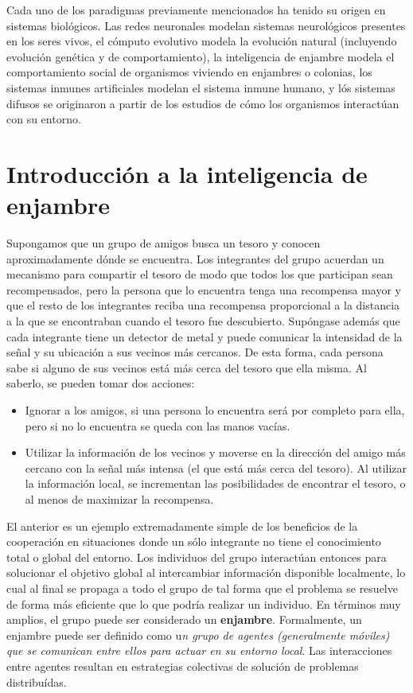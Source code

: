 \documentclass{article}
\begin{document}
Cada uno de los paradigmas previamente mencionados ha tenido su origen en sistemas biológicos.
Las redes neuronales modelan sistemas neurológicos presentes en los seres vivos, el cómputo evolutivo modela la evolución natural (incluyendo evolución genética y de comportamiento), la inteligencia de enjambre modela el comportamiento social de organismos viviendo en enjambres o colonias, los sistemas inmunes artificiales modelan el sistema inmune humano, y lós sistemas difusos se originaron a partir de los estudios de cómo los organismos interactúan con su entorno.

\section{Introducción a la inteligencia de enjambre}
Supongamos que un grupo de amigos busca un tesoro y conocen aproximadamente dónde se encuentra.
Los integrantes del grupo acuerdan un mecanismo para compartir el tesoro de modo que todos los que participan sean recompensados, pero la persona que lo encuentra tenga una recompensa mayor y que el resto de los integrantes reciba una recompensa proporcional a la distancia a la que se encontraban cuando el tesoro fue descubierto.
Supóngase además que cada integrante tiene un detector de metal y puede comunicar la intensidad de la señal y su ubicación a sus vecinos más cercanos.
De esta forma, cada persona sabe si alguno de sus vecinos está más cerca del tesoro que ella misma.
Al saberlo, se pueden tomar dos acciones:
\begin{itemize}
	\item Ignorar a los amigos, si una persona lo encuentra será por completo para ella, pero si no lo encuentra se queda con las manos vacías.
	\item Utilizar la información de los vecinos y moverse en la dirección del amigo más cercano con la señal más intensa (el que está más cerca del tesoro).
	Al utilizar la información local, se incrementan las posibilidades de encontrar el tesoro, o al menos de maximizar la recompensa.
\end{itemize}

El anterior es un ejemplo extremadamente simple de los beneficios de la cooperación en situaciones donde un sólo integrante no tiene el conocimiento total o global del entorno.
Los individuos del grupo interactúan entonces para solucionar el objetivo global al intercambiar información disponible localmente, lo cual al final se propaga a todo el grupo de tal forma que el problema se resuelve de forma más eficiente que lo que podría realizar un individuo.
En términos muy amplios, el grupo puede ser considerado un \textbf{enjambre}.
Formalmente, un enjambre puede ser definido como u\emph{n grupo de agentes (generalmente móviles) que se comunican entre ellos para actuar en su entorno local}.
Las interacciones entre agentes resultan en estrategias colectivas de solución de problemas distribuídas.
\end{document}
